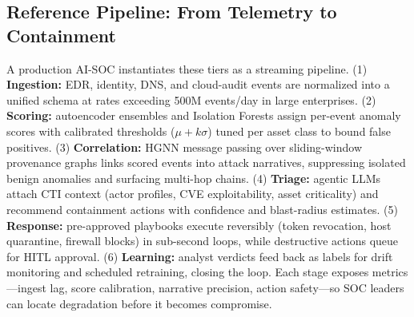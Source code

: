 \documentclass[conference,10pt,twocolumn,a4paper]{IEEEtran}
\begin{document}
\subsection{Reference Pipeline: From Telemetry to Containment}
A production AI-SOC instantiates these tiers as a streaming pipeline. (1) \textbf{Ingestion:} EDR, identity, DNS, and cloud-audit events are normalized into a unified schema at rates exceeding 500M events/day in large enterprises. (2) \textbf{Scoring:} autoencoder ensembles and Isolation Forests assign per-event anomaly scores with calibrated thresholds ($\mu + k\sigma$) tuned per asset class to bound false positives. (3) \textbf{Correlation:} HGNN message passing over sliding-window provenance graphs links scored events into attack narratives, suppressing isolated benign anomalies and surfacing multi-hop chains. (4) \textbf{Triage:} agentic LLMs attach CTI context (actor profiles, CVE exploitability, asset criticality) and recommend containment actions with confidence and blast-radius estimates. (5) \textbf{Response:} pre-approved playbooks execute reversibly (token revocation, host quarantine, firewall blocks) in sub-second loops, while destructive actions queue for HITL approval. (6) \textbf{Learning:} analyst verdicts feed back as labels for drift monitoring and scheduled retraining, closing the loop. Each stage exposes metrics---ingest lag, score calibration, narrative precision, action safety---so SOC leaders can locate degradation before it becomes compromise.
\end{document}
